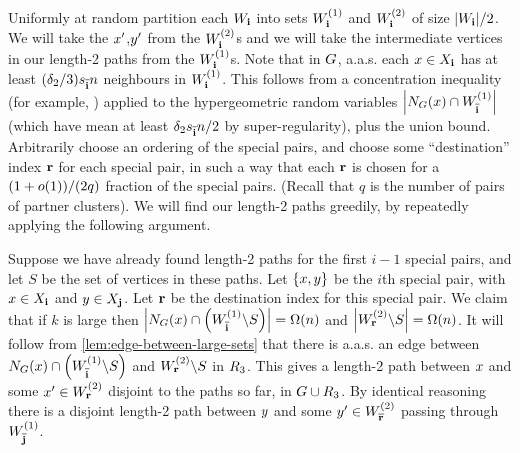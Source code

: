 \documentclass[11pt,english]{article}
\theoremstyle{plain}
\theoremstyle{plain}
\theoremstyle{plain}
\theoremstyle{plain}
\theoremstyle{plain}
\theoremstyle{definition}
\theoremstyle{definition}
\theoremstyle{remark}
\theoremstyle{remark}
\theoremstyle{plain}
\theoremstyle{definition}
\theoremstyle{definition}
\theoremstyle{plain}
\theoremstyle{plain}
\theoremstyle{plain}
\theoremstyle{plain}
\theoremstyle{remark}
\theoremstyle{plain}
\theoremstyle{definition}
\let\originalleft\left
\let\originalright\right
\renewcommand{\left}{\mathopen{}\mathclose\bgroup\originalleft}
\renewcommand{\right}{\aftergroup\egroup\originalright}
\begin{document}
Uniformly at random partition each $W_{\mathbf{i}}$ into sets $W_{\bi}^{\left(1\right)}$
and $W_{\bi}^{\left(2\right)}$ of size $\left|W_{\bi}\right|/2$.
We will take the $x'$,$y'$ from the $W_{\bi}^{\left(2\right)}$s
and we will take the intermediate vertices in our length-2 paths from
the $W_{\bi}^{\left(1\right)}$s. Note that in $G$, a.a.s. each
$x\in X_{\mathbf{i}}$ has at least $\left(\delta_{2}/3\right)s_{\flip{\bi}}n$
neighbours in $W_{\bi}^{\left(1\right)}$. This follows from a concentration
inequality (for example, \cite[Theorem 2.10]{JLR00}) applied to the
hypergeometric random variables $\left|N_{\G}\left(\x\right)\cap W_{\flip{\bi}}^{\left(1\right)}\right|$
(which have mean at least $\delta_{2}s_{\overline{\mathbf{i}}}n/2$ by super-regularity),
plus the union bound. Arbitrarily choose an ordering of the special
pairs, and choose some ``destination'' index $\mathbf{r}$ for each special
pair, in such a way that each $\mathbf{r}$ is chosen for a $\left(1+o\left(1\right)\right)/\left(2q\right)$
fraction of the special pairs. (Recall that $q$ is the number of
pairs of partner clusters). We will find our length-2 paths greedily,
by repeatedly applying the following argument.

Suppose we have already found length-2 paths for the first $i-1$
special pairs, and let $S$ be the set of vertices in these paths.
Let $\left\{ \x,\y\right\} $ be the $i$th special pair, with $x\in X_{\mathbf{i}}$
and $y\in X_{\mathbf{j}}$. Let $\mathbf{r}$ be the destination index for this
special pair. We claim that if $k$ is large then $\left|N_{\G}\left(\x\right)\cap\left(W_{\flip{\bi}}^{\left(1\right)}\backslash S\right)\right|=\Omega\left(n\right)$
and $\left|W_{\br}^{\left(2\right)}\backslash S\right|=\Omega\left(n\right)$.
It will follow from \ref{lem:edge-between-large-sets} that there
is a.a.s. an edge between $N_{\G}\left(\x\right)\cap\left(W_{\flip{\bi}}^{\left(1\right)}\backslash S\right)$
and $W_{\br}^{\left(2\right)}\backslash S$ in $R_{3}$. This gives
a length-2 path between $x$ and some $\x'\in W_{\br}^{\left(2\right)}$
disjoint to the paths so far, in $G\cup R_{3}$. By identical reasoning
there is a disjoint length-2 path between $y$ and some $\y'\in W_{\flip{\br}}^{\left(2\right)}$
passing through $W_{\flip{\bj}}^{\left(1\right)}$.
\end{document}
